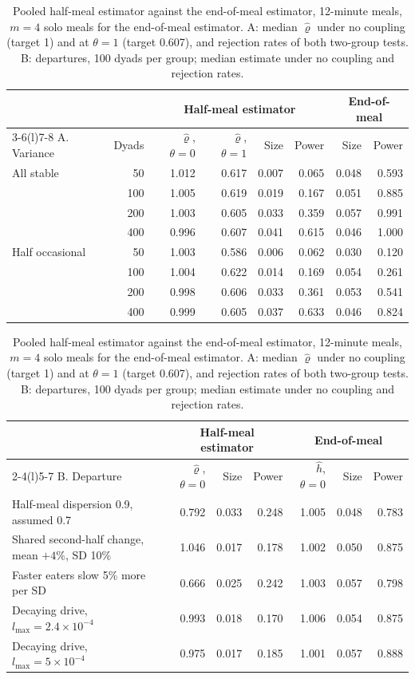 \documentclass[12pt]{article}
\theoremstyle{definition}
\begin{document}
\begin{table}[H]
\centering\footnotesize
\caption{Pooled half-meal estimator against the end-of-meal estimator, 12-minute
meals, $m=4$ solo meals for the end-of-meal estimator. A: median $\hat\varrho$ under
no coupling (target 1) and at $\theta=1$ (target 0.607), and rejection rates of
both two-group tests. B: departures, 100 dyads per group; median estimate under no
coupling and rejection rates.}\label{tab:timecourse}
\setlength{\tabcolsep}{4pt}
\begin{tabular}{@{}lrrrrrrr@{}}
\toprule
& & \multicolumn{4}{c}{Half-meal estimator} & \multicolumn{2}{c}{End-of-meal}\\
\cmidrule(lr){3-6}\cmidrule(l){7-8}
A. Variance & Dyads & $\hat\varrho$, $\theta=0$ & $\hat\varrho$, $\theta=1$ & Size & Power & Size & Power\\
\midrule
All stable & 50 & 1.012 & 0.617 & 0.007 & 0.065 & 0.048 & 0.593\\
 & 100 & 1.005 & 0.619 & 0.019 & 0.167 & 0.051 & 0.885\\
 & 200 & 1.003 & 0.605 & 0.033 & 0.359 & 0.057 & 0.991\\
 & 400 & 0.996 & 0.607 & 0.041 & 0.615 & 0.046 & 1.000\\
Half occasional & 50 & 1.003 & 0.586 & 0.006 & 0.062 & 0.030 & 0.120\\
 & 100 & 1.004 & 0.622 & 0.014 & 0.169 & 0.054 & 0.261\\
 & 200 & 0.998 & 0.606 & 0.033 & 0.361 & 0.053 & 0.541\\
 & 400 & 0.999 & 0.605 & 0.037 & 0.633 & 0.046 & 0.824\\
\bottomrule
\end{tabular}

\vspace{6pt}
\begin{tabular}{@{}lrrrrrr@{}}
\toprule
& \multicolumn{3}{c}{Half-meal estimator} & \multicolumn{3}{c}{End-of-meal}\\
\cmidrule(lr){2-4}\cmidrule(l){5-7}
B. Departure & $\hat\varrho$, $\theta=0$ & Size & Power & $\hat h$, $\theta=0$ & Size & Power\\
\midrule
Half-meal dispersion 0.9, assumed 0.7 & 0.792 & 0.033 & 0.248 & 1.005 & 0.048 & 0.783\\
Shared second-half change, mean $+4\%$, SD 10\% & 1.046 & 0.017 & 0.178 & 1.002 & 0.050 & 0.875\\
Faster eaters slow 5\% more per SD & 0.666 & 0.025 & 0.242 & 1.003 & 0.057 & 0.798\\
Decaying drive, $l_{\max}=2.4\times10^{-4}$ & 0.993 & 0.018 & 0.170 & 1.006 & 0.054 & 0.875\\
Decaying drive, $l_{\max}=5\times10^{-4}$ & 0.975 & 0.017 & 0.185 & 1.001 & 0.057 & 0.888\\
\bottomrule
\end{tabular}
\end{table}
\end{document}

